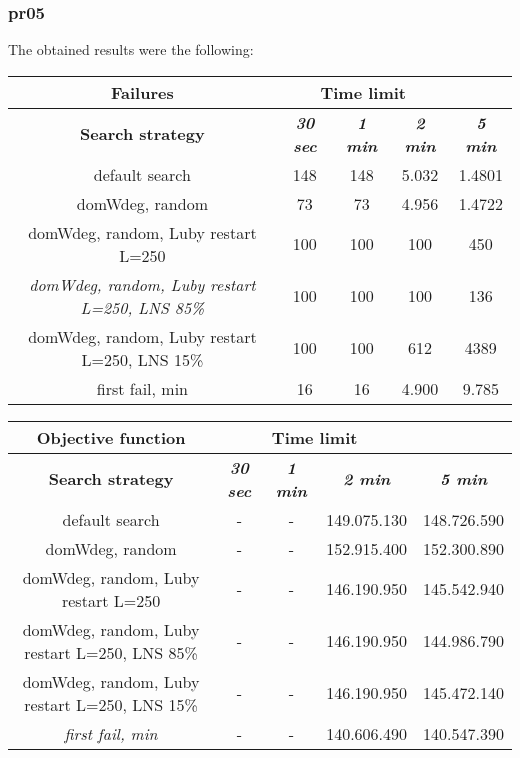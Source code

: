 \subsubsection{pr05}
The obtained results were the following:
{
\renewcommand{\arraystretch}{2}
\begin{longtable}[h]{| c | c | c | c | c |}
    \hline
    \textbf{Failures} & \multicolumn{3}{c}{Time limit} & \\
    \hline
    \textbf{Search strategy} & \textbf{\textit{30 sec}} & \textbf{\textit{1 min}} & \textbf{\textit{2 min}} & \textbf{\textit{5 min}} \\
    \hline
    \endhead
    default search                                         & 148 &  148 &  5.032 &  1.4801 \\
    \hline
    domWdeg, random                                        &  73 &   73 &  4.956 &  1.4722 \\
    \hline
    domWdeg, random, Luby restart L=250                    & 100 &  100 &   100 &    450 \\
    \hline
    \textit{domWdeg, random, Luby restart L=250, LNS 85\%} & 100 &  100 &   100 &    136 \\
    \hline
    domWdeg, random, Luby restart L=250, LNS 15\%          & 100 &  100 &   612 &   4389 \\
    \hline
    first fail, min                                        &  16 &   16 &  4.900 &   9.785 \\
    \hline
\end{longtable}
}

{
\renewcommand{\arraystretch}{2}
\begin{longtable}[h]{| c | c | c | c | c |}
    \hline
    \textbf{Objective function} & \multicolumn{3}{c}{Time limit} & \\
    \hline
    \textbf{Search strategy} & \textbf{\textit{30 sec}} & \textbf{\textit{1 min}} & \textbf{\textit{2 min}} & \textbf{\textit{5 min}} \\
    \hline
    \endhead
    default search                                        & - & - & 149.075.130 & 148.726.590 \\
    \hline
    domWdeg, random                                       & - & - & 152.915.400 & 152.300.890 \\
    \hline
    domWdeg, random, Luby restart L=250                   & - & - & 146.190.950 & 145.542.940 \\
    \hline
    domWdeg, random, Luby restart L=250, LNS 85\%         & - & - & 146.190.950 & 144.986.790 \\
    \hline
    domWdeg, random, Luby restart L=250, LNS 15\%         & - & - & 146.190.950 & 145.472.140 \\
    \hline
    \textit{first fail, min}                              & - & - & 140.606.490 & 140.547.390 \\
    \hline
\end{longtable}
}

